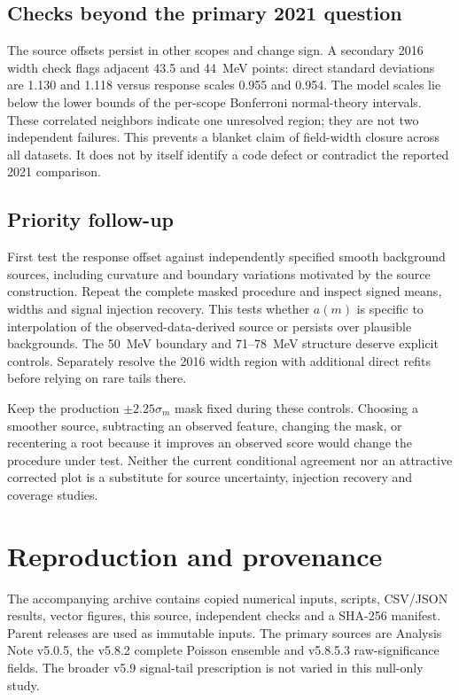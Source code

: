 \documentclass[10pt]{article}
\begin{document}
\subsection*{Checks beyond the primary 2021 question}

The source offsets persist in other scopes and change sign. A secondary
2016 width check flags adjacent 43.5 and 44~MeV points: direct standard
deviations are 1.130 and 1.118 versus response scales 0.955 and 0.954.
The model scales lie below the lower bounds of the per-scope Bonferroni
normal-theory intervals. These correlated
neighbors indicate one unresolved region; they are not two independent
failures. This prevents a blanket claim of field-width closure across all
datasets. It does not by itself identify a code defect or contradict the
reported 2021 comparison.

\subsection*{Priority follow-up}
First test the response offset against independently specified smooth
background sources, including curvature and boundary variations motivated
by the source construction. Repeat the complete masked procedure and inspect
signed means, widths and signal injection recovery. This tests whether
$a(m)$ is specific to interpolation of the observed-data-derived source or
persists over plausible backgrounds. The 50~MeV boundary and 71--78~MeV
structure deserve explicit controls. Separately resolve the 2016 width
region with additional direct refits before relying on rare tails there.

Keep the production $\pm2.25\sigma_m$ mask fixed during these controls.
Choosing a smoother source, subtracting an observed feature, changing the
mask, or recentering a root because it improves an observed score would
change the procedure under test. Neither the current conditional agreement
nor an attractive corrected plot is a substitute for source uncertainty,
injection recovery and coverage studies.

\clearpage
\section{Reproduction and provenance}
The accompanying archive contains copied numerical inputs, scripts, CSV/JSON
results, vector figures, this source, independent checks and a SHA-256
manifest. Parent releases are used as immutable inputs. The primary sources
are Analysis Note v5.0.5, the v5.8.2 complete Poisson ensemble and v5.8.5.3
raw-significance fields. The broader v5.9 signal-tail prescription is not
varied in this null-only study.
\end{document}
